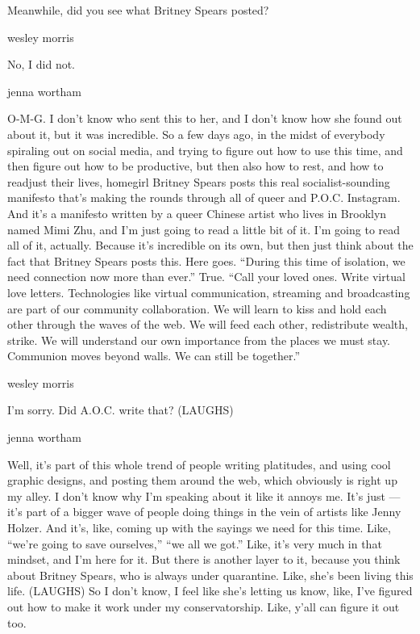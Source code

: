 Meanwhile, did you see what Britney Spears posted?

wesley morris

No, I did not.

jenna wortham

O-M-G. I don't know who sent this to her, and I don't know how she found
out about it, but it was incredible. So a few days ago, in the midst of
everybody spiraling out on social media, and trying to figure out how to
use this time, and then figure out how to be productive, but then also
how to rest, and how to readjust their lives, homegirl Britney Spears
posts this real socialist-sounding manifesto that's making the rounds
through all of queer and P.O.C. Instagram. And it's a manifesto written
by a queer Chinese artist who lives in Brooklyn named Mimi Zhu, and I'm
just going to read a little bit of it. I'm going to read all of it,
actually. Because it's incredible on its own, but then just think about
the fact that Britney Spears posts this. Here goes. ``During this time
of isolation, we need connection now more than ever.'' True. ``Call your
loved ones. Write virtual love letters. Technologies like virtual
communication, streaming and broadcasting are part of our community
collaboration. We will learn to kiss and hold each other through the
waves of the web. We will feed each other, redistribute wealth, strike.
We will understand our own importance from the places we must stay.
Communion moves beyond walls. We can still be together.''

wesley morris

I'm sorry. Did A.O.C. write that? (LAUGHS)

jenna wortham

Well, it's part of this whole trend of people writing platitudes, and
using cool graphic designs, and posting them around the web, which
obviously is right up my alley. I don't know why I'm speaking about it
like it annoys me. It's just --- it's part of a bigger wave of people
doing things in the vein of artists like Jenny Holzer. And it's, like,
coming up with the sayings we need for this time. Like, ``we're going to
save ourselves,'' ``we all we got.'' Like, it's very much in that
mindset, and I'm here for it. But there is another layer to it, because
you think about Britney Spears, who is always under quarantine. Like,
she's been living this life. (LAUGHS) So I don't know, I feel like she's
letting us know, like, I've figured out how to make it work under my
conservatorship. Like, y'all can figure it out too.

